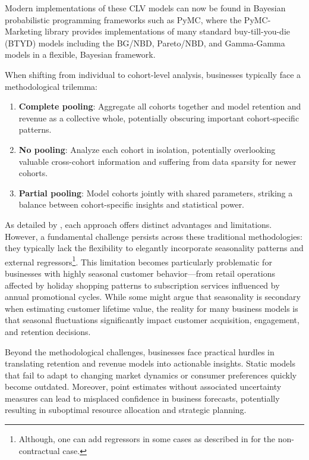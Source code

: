 \documentclass[11pt]{amsart}
\theoremstyle{definition}
\begin{document}
Modern implementations of these CLV models can now be found in Bayesian probabilistic programming frameworks such as PyMC,
where the PyMC-Marketing library \cite{pymc_marketing} provides implementations of many standard buy-till-you-die (BTYD)
models including the BG/NBD, Pareto/NBD, and Gamma-Gamma models in a flexible, Bayesian framework.

When shifting from individual to cohort-level analysis, businesses typically face a methodological trilemma:

\begin{enumerate}
    \item \textbf{Complete pooling}: Aggregate all cohorts together and model retention and revenue as a collective whole,
          potentially obscuring important cohort-specific patterns.

    \item \textbf{No pooling}: Analyze each cohort in isolation, potentially overlooking valuable cross-cohort information
          and suffering from data sparsity for newer cohorts.

    \item \textbf{Partial pooling}: Model cohorts jointly with shared parameters, striking a balance between cohort-specific
          insights and statistical power.
\end{enumerate}

As detailed by \cite{FaderHardieNote2017}, each approach offers distinct advantages and limitations. However, a fundamental
challenge persists across these traditional methodologies: they typically lack the flexibility to elegantly incorporate
seasonality patterns and external regressors\footnote{Although, one can add regressors in some cases as described in
    \cite{FaderHardieNote2007} for the non-contractual case.}. This limitation becomes particularly problematic for businesses
with highly seasonal customer behavior—from retail operations affected by holiday shopping patterns to subscription services
influenced by annual promotional cycles. While some might argue that seasonality is secondary when estimating customer
lifetime value, the reality for many business models is that seasonal fluctuations significantly impact customer acquisition,
engagement, and retention decisions.

Beyond the methodological challenges, businesses face practical hurdles in translating retention and revenue models into
actionable insights. Static models that fail to adapt to changing market dynamics or consumer preferences quickly become
outdated. Moreover, point estimates without associated uncertainty measures can lead to misplaced confidence in business
forecasts, potentially resulting in suboptimal resource allocation and strategic planning.
\end{document}
